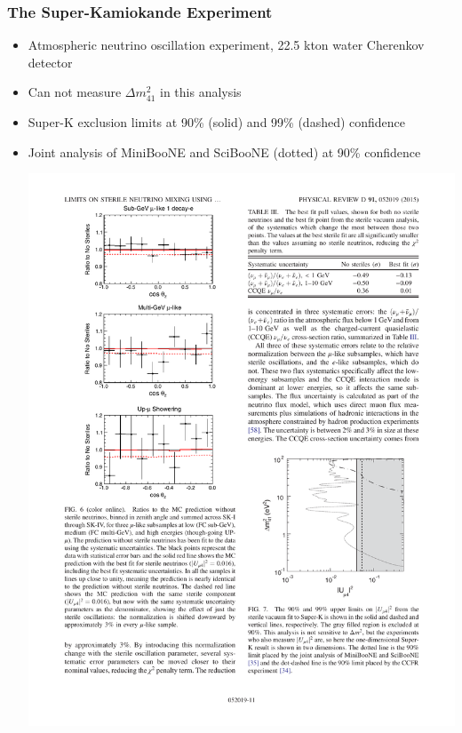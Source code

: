 \documentclass[mathserif,18pt,xcolor=table]{beamer}
\begin{document}
\begin{frame}
  \frametitle{The Super-Kamiokande Experiment}
  \begin{itemize}
  \item Atmospheric neutrino oscillation experiment, 22.5 kton water Cherenkov detector
  \item Can not measure $\Delta m^{2}_{41}$ in this analysis
  \item Super-K exclusion limits at 90\% (solid) and 99\% (dashed) confidence
  \item Joint analysis of MiniBooNE and SciBooNE (dotted) at 90\% confidence
    \begin{center}
      \includegraphics[width=.5\linewidth]{../figures/sk1.pdf}
    \end{center}
  \end{itemize}
\end{frame}
\end{document}
